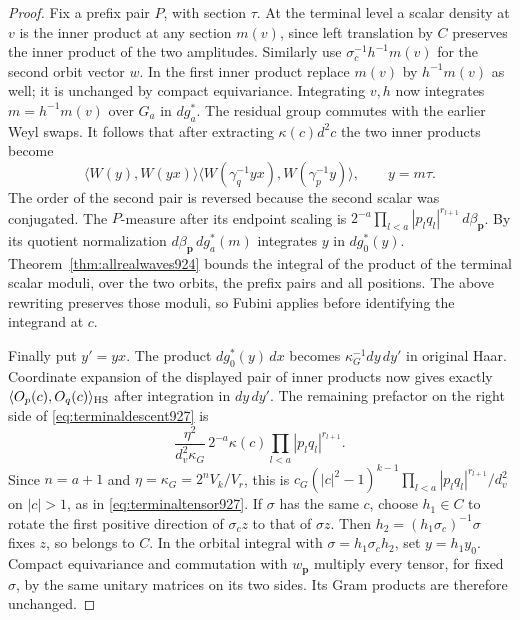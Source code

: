 \documentclass[a4paper,11pt]{article}
\theoremstyle{definition}
\theoremstyle{remark}
\numberwithin{equation}{section}
\begin{document}
\begin{proof}
Fix a prefix pair \(P\), with section \(\tau\). At the terminal
level a scalar density at \(v\) is the inner product at any
section \(m(v)\), since left translation by \(C\) preserves
the inner product of the two amplitudes. Similarly use
\(\sigma_c^{-1}h^{-1}m(v)\) for the second orbit vector \(w\).
In the first inner product replace \(m(v)\) by \(h^{-1}m(v)\)
as well; it is unchanged by compact equivariance. Integrating
\(v,h\) now integrates \(m=h^{-1}m(v)\) over \(G_a\) in
\(dg_a^*\). The residual group commutes with the earlier Weyl
swaps. It follows that after extracting \(\kappa(c)d^2c\)
the two inner products become
\[
  \langle W(y),W(yx)\rangle
       \langle W(\gamma_q^{-1}yx),W(\gamma_p^{-1}y)\rangle,
                  \qquad y=m\tau .
\]
The order of the second pair is reversed because the second
scalar was conjugated. The \(P\)-measure after its endpoint
scaling is \(2^{-a}\prod_{l<a}|p_l q_l|^{r_{l+1}}\,d\beta_{\mathbf p}\).
By its quotient normalization \(d\beta_{\mathbf p}\,dg_a^*(m)\)
integrates \(y\) in \(dg_0^*(y)\).
Theorem~\ref{thm:allrealwaves924} bounds the integral of the
product of the terminal scalar moduli, over the two orbits,
the prefix pairs and all positions. The above rewriting
preserves those moduli, so Fubini applies before identifying
the integrand at \(c\).

Finally put \(y'=yx\). The product \(dg_0^*(y)\,dx\) becomes
\(\kappa_G^{-1}dy\,dy'\) in original Haar. Coordinate expansion
of the displayed pair of inner products now gives exactly
\(\langle O_p(c),O_q(c)\rangle_{\rm HS}\) after integration in
\(dy\,dy'\). The remaining prefactor on the right side of
\eqref{eq:terminaldescent927} is
\[
  \frac{\eta^2}{d_v^2\kappa_G}\,2^{-a}\kappa(c)
                              \prod_{l<a}|p_l q_l|^{r_{l+1}}.
\]
Since \(n=a+1\) and \(\eta=\kappa_G=2^n V_k/V_r\), this is
\(c_G (|c|^2-1)^{k-1}\prod_{l<a}|p_l q_l|^{r_{l+1}}/d_v^2\)
on \(|c|>1\), as in \eqref{eq:terminaltensor927}.
If \(\sigma\) has the same \(c\), choose \(h_1\in C\) to rotate
the first positive direction of \(\sigma_c z\) to that of
\(\sigma z\). Then \(h_2=(h_1\sigma_c)^{-1}\sigma\) fixes
\(z\), so belongs to \(C\). In the orbital integral with
\(\sigma=h_1\sigma_c h_2\), set \(y=h_1 y_0\). Compact
equivariance and commutation with \(w_{\mathbf p}\) multiply
every tensor, for fixed \(\sigma\), by the same unitary matrices
on its two sides. Its Gram products are therefore unchanged.
\end{proof}
\end{document}
